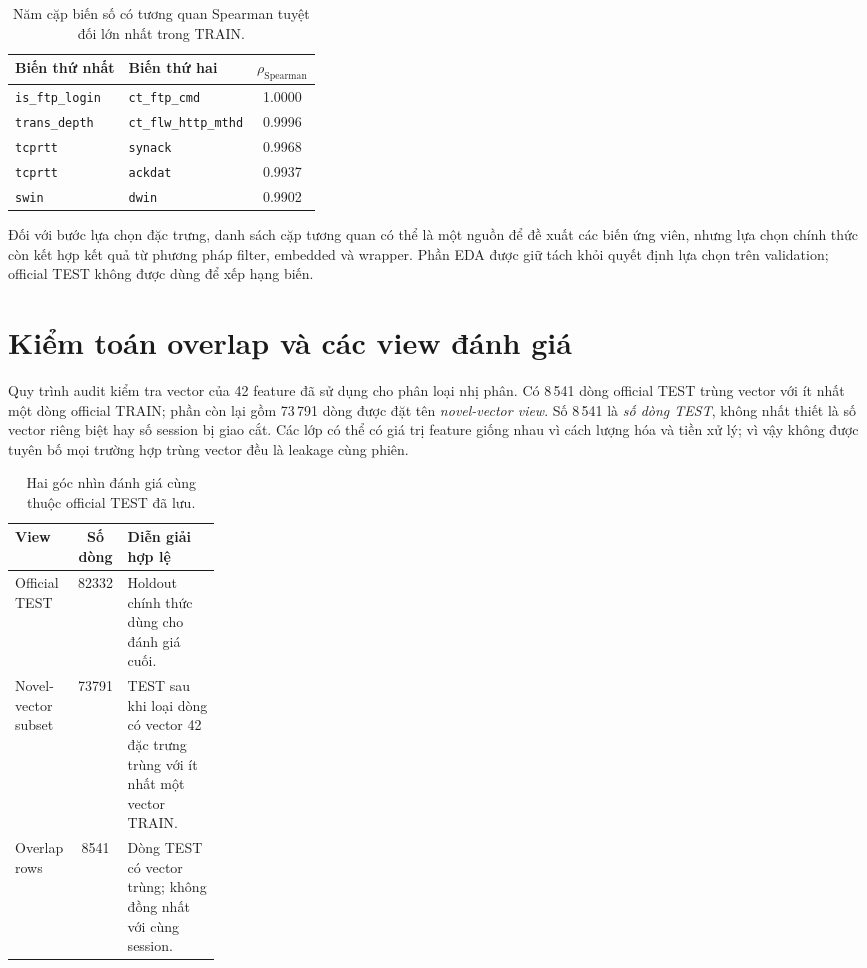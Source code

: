 \begin{table}[htbp]
\centering
\small
\renewcommand{\arraystretch}{1.25}
\setlength{\tabcolsep}{8pt}
\caption{Năm cặp biến số có tương quan Spearman tuyệt đối lớn nhất trong TRAIN.}
\label{tab:eda-high-correlation}
\begin{tabularx}{\linewidth}{X X S[table-format=1.4]}
\toprule
Biến thứ nhất & Biến thứ hai & {$\rho_{\mathrm{Spearman}}$}\\
\midrule
\texttt{is\_ftp\_login} & \texttt{ct\_ftp\_cmd} & 1.0000\\
\texttt{trans\_depth} & \texttt{ct\_flw\_http\_mthd} & 0.9996\\
\texttt{tcprtt} & \texttt{synack} & 0.9968\\
\texttt{tcprtt} & \texttt{ackdat} & 0.9937\\
\texttt{swin} & \texttt{dwin} & 0.9902\\
\bottomrule
\end{tabularx}
\end{table}

Đối với bước lựa chọn đặc trưng, danh sách cặp tương quan có thể là một nguồn để đề xuất các biến ứng viên, nhưng lựa chọn chính thức còn kết hợp kết quả từ phương pháp filter, embedded và wrapper. Phần EDA được giữ tách khỏi quyết định lựa chọn trên validation; official TEST không được dùng để xếp hạng biến.

\section{Kiểm toán overlap và các view đánh giá}
Quy trình audit kiểm tra vector của 42 feature đã sử dụng cho phân loại nhị phân. Có 8\,541 dòng official TEST trùng vector với ít nhất một dòng official TRAIN; phần còn lại gồm 73\,791 dòng được đặt tên \emph{novel-vector view}. Số 8\,541 là \emph{số dòng TEST}, không nhất thiết là số vector riêng biệt hay số session bị giao cắt. Các lớp có thể có giá trị feature giống nhau vì cách lượng hóa và tiền xử lý; vì vậy không được tuyên bố mọi trường hợp trùng vector đều là leakage cùng phiên.

\begin{table}[htbp]
\centering\small
\renewcommand{\arraystretch}{1.3}
\setlength{\tabcolsep}{8pt}
\caption{Hai góc nhìn đánh giá cùng thuộc official TEST đã lưu.}
\label{tab:views-test}
\begin{tabularx}{\linewidth}{p{0.24\linewidth} S[table-format=5.0] X}\toprule
View & {Số dòng} & Diễn giải hợp lệ\\\midrule
Official TEST & 82332 & Holdout chính thức dùng cho đánh giá cuối.\\
Novel-vector subset & 73791 & TEST sau khi loại dòng có vector 42 đặc trưng trùng với ít nhất một vector TRAIN.\\
Overlap rows & 8541 & Dòng TEST có vector trùng; không đồng nhất với cùng session.\\\bottomrule
\end{tabularx}
\end{table}

